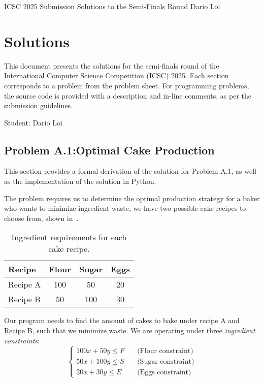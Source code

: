 \documentclass{solutionclass} %
\begin{document}
\pretitle%
{ICSC 2025 Submission}                          %
{Solutions to the Semi-Finals Round}          %
{Dario Loi} %

\makeatletter
    \startcontents[sections]
    \chapter{Solutions}
\makeatother

    This document presents the solutions for the semi-finals round of the International Computer Science Competition (ICSC) 2025. Each section corresponds to a problem from the problem sheet. For programming problems, the source code is provided with a description and in-line comments, as per the submission guidelines.

    Student: Dario Loi\\
    \divider%

    \clearpage

    \section{Problem A.1:\@ Optimal Cake Production}\label{sec:problem_a1}
    This section provides a formal derivation of the solution for Problem A.1, as well as the implementation of the solution in Python.

    The problem requires us to determine the optimal production strategy for a baker who wants to minimize ingredient waste, we have two possible cake recipes to choose from, shown in~.

    \begin{table}[b]
        \centering
        \begin{tabular}{lccc}
            \toprule
            Recipe & Flour & Sugar & Eggs \\
            \midrule
            Recipe A & 100 & 50 & 20 \\
            Recipe B & 50 & 100 & 30 \\
            \bottomrule
        \end{tabular}
        \caption{Ingredient requirements for each cake recipe.}\label{tab:recipes}
    \end{table}

    Our program needs to find the amount of cakes to bake under recipe A and Recipe B, such that we minimize waste. We are operating under three \emph{ingredient constraints}:
    \begin{equation}\label{eq:constraints}
        \begin{cases}
            100x + 50y \leq F \quad &\text{(Flour constraint)} \\
            50x + 100y \leq S \quad &\text{(Sugar constraint)} \\
            20x + 30y \leq E \quad &\text{(Eggs constraint)}
        \end{cases}
    \end{equation}
\end{document}
